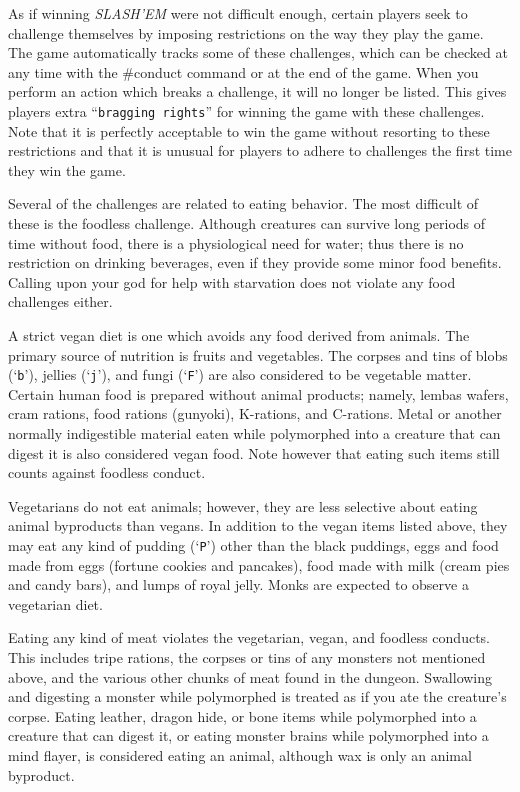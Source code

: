 
As if winning {\it SLASH'EM\/} were not difficult enough, certain players
seek to challenge themselves by imposing restrictions on the
way they play the game.  The game automatically tracks some of
these challenges, which can be checked at any time with the \#conduct
command or at the end of the game.  When you perform an action which
breaks a challenge, it will no longer be listed.  This gives
players extra ``{\tt bragging rights}'' for winning the game with these
challenges.  Note that it is perfectly acceptable to win the game
without resorting to these restrictions and that it is unusual for
players to adhere to challenges the first time they win the game.

Several of the challenges are related to eating behavior.  The most
difficult of these is the foodless challenge.  Although creatures
can survive long periods of time without food, there is a physiological
need for water; thus there is no restriction on drinking beverages,
even if they provide some minor food benefits.
Calling upon your god for help with starvation does
not violate any food challenges either.

A strict vegan diet is one which avoids any food derived from animals.
The primary source of nutrition is fruits and vegetables.  The
corpses and tins of blobs (`{\tt b}'), jellies (`{\tt j}'), and fungi (`{\tt F}') are
also considered to be vegetable matter.  Certain human
food is prepared without animal products; namely, lembas wafers, cram
rations, food rations (gunyoki), K-rations, and C-rations.
Metal or another normally indigestible material eaten while polymorphed
into a creature that can digest it is also considered vegan food.
Note however that eating such items still counts against foodless conduct.

Vegetarians do not eat animals;
however, they are less selective about eating animal byproducts than vegans.
In addition to the vegan items listed above, they may eat any kind
of pudding (`{\tt P}') other than the black puddings,
eggs and food made from eggs (fortune cookies and pancakes),
food made with milk (cream pies and candy bars), and lumps of
royal jelly.  Monks are expected to observe a vegetarian diet.

Eating any kind of meat violates the vegetarian, vegan, and foodless
conducts.  This includes tripe rations, the corpses or tins of any
monsters not mentioned above, and the various other chunks of meat
found in the dungeon.  Swallowing and digesting a monster while polymorphed
is treated as if you ate the creature's corpse.
Eating leather, dragon hide, or bone items while
polymorphed into a creature that can digest it, or eating monster brains
while polymorphed into a mind flayer, is considered eating
an animal, although wax is only an animal byproduct.

